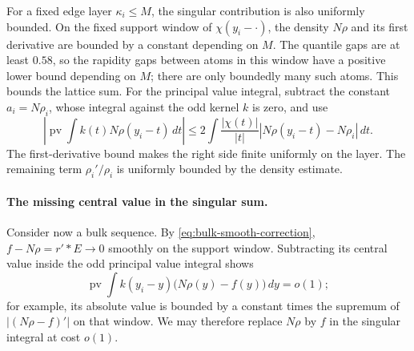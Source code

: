 For a fixed edge layer \(\kappa_i\le M\), the singular contribution is also uniformly bounded. On the fixed support window of \(\chi(y_i-\cdot)\), the density \(N\rho\) and its first derivative are bounded by a constant depending on \(M\). The quantile gaps are at least \(0.58\), so the rapidity gaps between atoms in this window have a positive lower bound depending on \(M\); there are only boundedly many such atoms. This bounds the lattice sum. For the principal value integral, subtract the constant \(a_i=N\rho_i\), whose integral against the odd kernel \(k\) is zero, and use
\[
 \left|\operatorname{pv}\!\int k(t)N\rho(y_i-t)\,dt\right|
 \le 2\int\frac{|\chi(t)|}{|t|}
       |N\rho(y_i-t)-N\rho_i|\,dt.
\]
The first-derivative bound makes the right side finite uniformly on the layer. The remaining term \(\rho_i'/\rho_i\) is uniformly bounded by the density estimate.

\paragraph{The missing central value in the singular sum.}
Consider now a bulk sequence. By \eqref{eq:bulk-smooth-correction},
\(f-N\rho=r'*E\to0\) smoothly on the support window. Subtracting its central value inside the odd principal value integral shows
\[
 \operatorname{pv}\!\int k(y_i-y)\bigl(N\rho(y)-f(y)\bigr)\,dy=o(1);
\]
for example, its absolute value is bounded by a constant times the supremum of \(|(N\rho-f)'|\) on that window. We may therefore replace \(N\rho\) by \(f\) in the singular integral at cost \(o(1)\).

